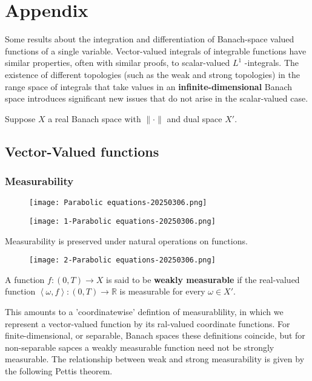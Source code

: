 \section{Appendix}

Some results about the integration and differentiation of Banach-space valued functions of a single variable.
Vector-valued integrals of integrable functions have similar properties, often with similar proofs, to scalar-valued $\displaystyle L^{1}$ -integrals.
The existence of different topologies (such as the weak and strong topologies) in the range space of integrals that take values in an \textbf{infinite-dimensional} Banach space introduces significant new issues that do not arise in the scalar-valued case.

Suppose $X$ a real Banach space with $\lVert \cdot \rVert$ and dual space $X'$.

\subsection{Vector-Valued functions}

\subsubsection{Measurability}

\begin{definition}
\begin{figure}[H]
\centering
\texttt{[image: Parabolic equations-20250306.png]}
\label{}
\end{figure}
\end{definition}
\begin{definition}
\begin{figure}[H]
\centering
\texttt{[image: 1-Parabolic equations-20250306.png]}
\label{}
\end{figure}
\end{definition}
Measurability is preserved under natural operations on functions.

\begin{figure}[H]
\centering
\texttt{[image: 2-Parabolic equations-20250306.png]}
\label{}
\end{figure}

\begin{definition}
A function $\displaystyle f:(0,T)\to X$ is said to be \textbf{weakly measurable} if the real-valued function $\displaystyle \left< \omega,f \right>:(0,T)\to \mathbb{R}$ is measurable for every $\displaystyle \omega\in X'$.
\end{definition}
This amounts to a 'coordinatewise' defintion of measurablility, in which we represent a vector-valued function by its ral-valued coordinate functions.
For finite-dimensional, or separable, Banach spaces these definitions coincide, but for non-separable sapces a weakly measurable function need not be strongly measurable.
The relationship between weak and strong measurability is given by the following Pettis theorem.

